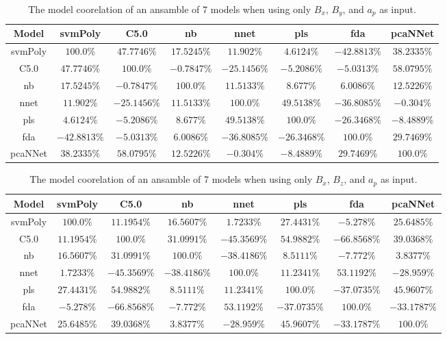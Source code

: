 \begin{table}[!ht]
	\centering
	\begin{tabular}{|c|c|c|c|c|c|c|c|}
		\hline
		Model & svmPoly & C5.0 & nb & nnet & pls & fda & pcaNNet \\ \hline
		svmPoly & $100.0\%$ & $47.7746\%$ & $17.5245\%$ & $11.902\%$ & $4.6124\%$ & $-42.8813\%$ & $38.2335\%$ \\ \hline
		C5.0 & $47.7746\%$ & $100.0\%$ & $-0.7847\%$ & $-25.1456\%$ & $-5.2086\%$ & $-5.0313\%$ & $58.0795\%$ \\ \hline
		nb & $17.5245\%$ & $-0.7847\%$ & $100.0\%$ & $11.5133\%$ & $8.677\%$ & $6.0086\%$ & $12.5226\%$ \\ \hline
		nnet & $11.902\%$ & $-25.1456\%$ & $11.5133\%$ & $100.0\%$ & $49.5138\%$ & $-36.8085\%$ & $-0.304\%$ \\ \hline
		pls & $4.6124\%$ & $-5.2086\%$ & $8.677\%$ & $49.5138\%$ & $100.0\%$ & $-26.3468\%$ & $-8.4889\%$ \\ \hline
		fda & $-42.8813\%$ & $-5.0313\%$ & $6.0086\%$ & $-36.8085\%$ & $-26.3468\%$ & $100.0\%$ & $29.7469\%$ \\ \hline
		pcaNNet & $38.2335\%$ & $58.0795\%$ & $12.5226\%$ & $-0.304\%$ & $-8.4889\%$ & $29.7469\%$ & $100.0\%$ \\ \hline
	\end{tabular}
	\caption{The model coorelation of an ansamble of 7 models when using only $B_{x}$, $B_{y}$, and $a_{p}$ as input.}
	\label{tab:ansamble7:xyap}
\end{table}

\begin{table}[!ht]
	\centering
	\begin{tabular}{|c|c|c|c|c|c|c|c|}
		\hline
		Model & svmPoly & C5.0 & nb & nnet & pls & fda & pcaNNet \\ \hline
		svmPoly & $100.0\%$ & $11.1954\%$ & $16.5607\%$ & $1.7233\%$ & $27.4431\%$ & $-5.278\%$ & $25.6485\%$ \\ \hline
		C5.0 & $11.1954\%$ & $100.0\%$ & $31.0991\%$ & $-45.3569\%$ & $54.9882\%$ & $-66.8568\%$ & $39.0368\%$ \\ \hline
		nb & $16.5607\%$ & $31.0991\%$ & $100.0\%$ & $-38.4186\%$ & $8.5111\%$ & $-7.772\%$ & $3.8377\%$ \\ \hline
		nnet & $1.7233\%$ & $-45.3569\%$ & $-38.4186\%$ & $100.0\%$ & $11.2341\%$ & $53.1192\%$ & $-28.959\%$ \\ \hline
		pls & $27.4431\%$ & $54.9882\%$ & $8.5111\%$ & $11.2341\%$ & $100.0\%$ & $-37.0735\%$ & $45.9607\%$ \\ \hline
		fda & $-5.278\%$ & $-66.8568\%$ & $-7.772\%$ & $53.1192\%$ & $-37.0735\%$ & $100.0\%$ & $-33.1787\%$ \\ \hline
		pcaNNet & $25.6485\%$ & $39.0368\%$ & $3.8377\%$ & $-28.959\%$ & $45.9607\%$ & $-33.1787\%$ & $100.0\%$ \\ \hline
	\end{tabular}
	\caption{The model coorelation of an ansamble of 7 models when using only $B_{x}$, $B_{z}$, and $a_{p}$ as input.}
	\label{tab:ansamble7:xzap}
\end{table}

